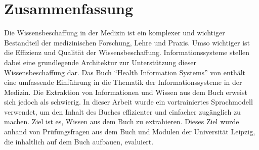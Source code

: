 \chapter*{Zusammenfassung}
%

Die Wissensbeschaffung in der Medizin ist ein komplexer und wichtiger Bestandteil der medizinischen Forschung, Lehre und Praxis.
Umso wichtiger ist die Effizienz und Qualität der Wissensbeschaffung.
Informationssysteme stellen dabei eine grundlegende Architektur zur Unterstützung dieser Wissensbeschaffung dar.
Das Buch \enquote{Health Information Systems} von \citet{bb} enthält eine umfassende Einführung in die Thematik der Informationssysteme in der Medizin.
Die Extraktion von Informationen und Wissen aus dem Buch erweist sich jedoch als schwierig.
In dieser Arbeit wurde ein vortrainiertes Sprachmodell verwendet, um den Inhalt des Buches effizienter und einfacher zugänglich zu machen.
Ziel ist es, Wissen aus dem Buch zu extrahieren.
Dieses Ziel wurde anhand von Prüfungsfragen aus dem Buch und Modulen der Universität Leipzig, die inhaltlich auf dem Buch aufbauen, evaluiert.

